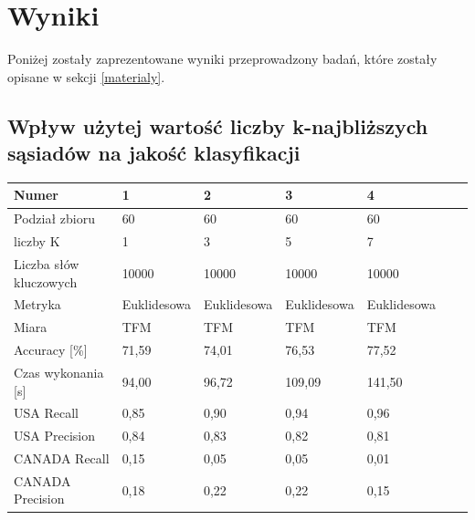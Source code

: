 \documentclass{classrep}
\begin{document}
    \section{Wyniki} {

        Poniżej zostały zaprezentowane wyniki przeprowadzony badań, które zostały
        opisane w sekcji \ref{materialy}.

        \subsection{Wpływ użytej wartość liczby k-najbliższych sąsiadów na jakość klasyfikacji} {

             \begin{table}[!htbp]
                \centering
                \begin{tabular}{|l|l|l|l|l|l|l|}
                    \hline
                    Numer                  & 1                  & 2             & 3             & 4             \\ \hline
                    Podział zbioru         & 60		            & 60		    & 60		    & 60		    \\ \hline
                    liczby K               & 1			        & 3			    & 5			    & 7			    \\ \hline
                    Liczba słów kluczowych & 10000		        & 10000		    & 10000		    & 10000		    \\ \hline
                    Metryka                & Euklidesowa	    & Euklidesowa 	& Euklidesowa	& Euklidesowa	\\ \hline
                    Miara                  & TFM		        & TFM		    & TFM		    & TFM		    \\ \hline
                    Accuracy {[}\%{]}      & 71,59		        & 74,01		    & 76,53		    & 77,52		    \\ \hline
                    Czas wykonania {[}s{]} & 94,00		        & 96,72		    & 109,09	    & 141,50	    \\ \hline
                    USA Recall             & 0,85		        & 0,90		    & 0,94		    & 0,96		    \\ \hline
                    USA Precision          & 0,84		        & 0,83		    & 0,82		    & 0,81		    \\ \hline
                    CANADA Recall          & 0,15		        & 0,05		    & 0,05		    & 0,01		    \\ \hline
                    CANADA Precision       & 0,18		        & 0,22		    & 0,22		    & 0,15		    \\ \hline

\end{tabular}
\end{table}}}
\end{document}
